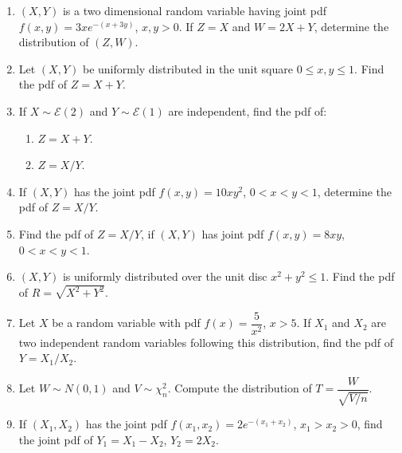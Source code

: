 \documentclass[svgnames]{amsart}
\begin{document}
\begin{enumerate}[leftmargin=*, itemsep=2mm]
\item $(X, Y)$ is a two dimensional random variable having joint pdf $f(x, y) = 3xe^{-(x+3y)}$, $x,y > 0$. If $Z = X$ and $W = 2X + Y$, determine the distribution of $(Z, W)$.

\item Let $(X, Y)$ be uniformly distributed in the unit square $0 \le x, y \le 1$. Find the pdf of $Z = X + Y$.

\item If $X \sim \mathcal E(2)$ and $Y \sim \mathcal E(1)$ are independent, find the pdf of:
\begin{enumerate}
	\item $Z = X + Y$.
	\item $Z = X/Y$.
\end{enumerate}

\item If $(X, Y)$ has the joint pdf $f(x, y) = 10xy^2$, $0 < x < y < 1$, determine the pdf of $Z = X/Y$.

\item Find the pdf of $Z = X/Y$, if $(X, Y)$ has joint pdf $f(x, y) = 8xy$, $0 < x < y < 1$.

\item $(X, Y)$ is uniformly distributed over the unit disc $x^2 + y^2 \le 1$. Find the pdf of $R = \sqrt{X^2 + Y^2}$.

\item Let $X$ be a random variable with pdf $f(x) = \dfrac 5 {x^2}$, $x > 5$. If $X_1$ and $X_2$ are two independent random variables following this distribution, find the pdf of $Y = X_1/X_2$.

\item Let $W \sim N(0, 1)$ and $V \sim \chi^2_n$. Compute the distribution of $T = \dfrac{W}{\sqrt{V/n}}$.

\item If $(X_1, X_2)$ has the joint pdf $f(x_1, x_2) = 2e^{-(x_1 + x_2)}$, $x_1 > x_2 > 0$, find the joint pdf of $Y_1 = X_1 - X_2$, $Y_2 = 2X_2$.

\end{enumerate}
\end{document}
